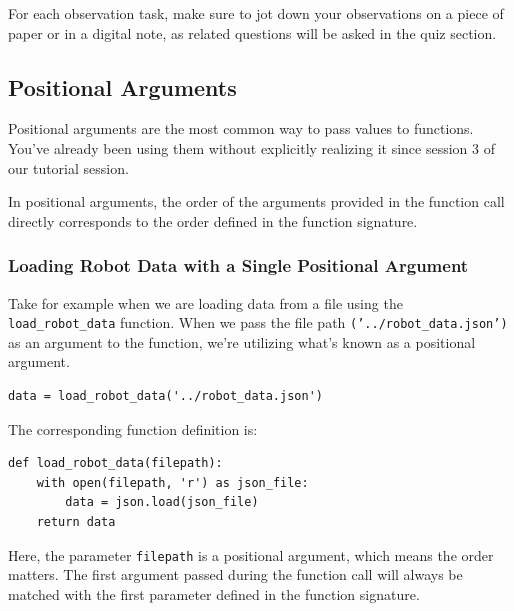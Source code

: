 For each observation task, make sure to jot down your observations on a piece of paper or in a digital note, as related questions will be asked in the quiz section.





\subsection{Positional Arguments}
Positional arguments are the most common way to pass values to functions. You've already been using them without explicitly realizing it since session 3 of our tutorial session.
 
In positional arguments, the order of the arguments provided in the function call directly corresponds to the order defined in the function signature.


\subsubsection{Loading Robot Data with a Single Positional Argument}

Take for example when we are loading data from a file using the \texttt{load\_robot\_data} function. When we pass the file path \texttt{('../robot\_data.json')} as an argument to the function, we're utilizing what's known as a positional argument.

\begin{verbatim}
data = load_robot_data('../robot_data.json')
\end{verbatim}


The corresponding function definition is:

\begin{verbatim}
def load_robot_data(filepath):
    with open(filepath, 'r') as json_file:
        data = json.load(json_file)
    return data
\end{verbatim}


Here, the parameter \texttt{filepath} is a positional argument, which means the order matters. The first argument passed during the function call will always be matched with the first parameter defined in the function signature.





